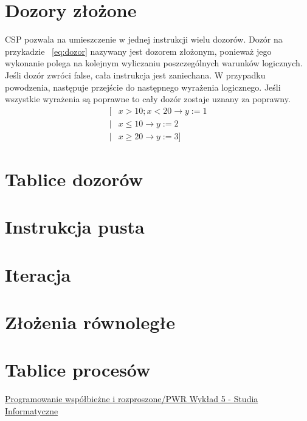 \documentclass[a4paper]{report}
\begin{document}
  \section{Dozory złożone}
  CSP pozwala na umieszczenie w jednej instrukcji wielu dozorów.
  Dozór na przykadzie ~\ref{eq:dozor} nazywany jest dozorem złożonym, ponieważ jego wykonanie polega na kolejnym wyliczaniu poszczególnych warunków logicznych.
  Jeśli dozór zwróci false, cała instrukcja jest zaniechana.
  W przypadku powodzenia, następuje przejście do następnego wyrażenia logicznego.
  Jeśli wszystkie wyrażenia są poprawne to cały dozór zostaje uznany za poprawny.
  \begin{equation}
    \label{eq:dozor}
    \begin{split}
      \lbrack & x > 10; x < 20 \rightarrow y := 1\\
      | & x \leq 10 \rightarrow y := 2\\
      | & x \geq 20 \rightarrow y := 3 \rbrack
    \end{split}
  \end{equation}

  \section{Tablice dozorów}

  \section{Instrukcja pusta}

  \section{Iteracja}

  \section{Złożenia równoległe}

  \section{Tablice procesów}

  \begin{thebibliography}{9}
     \href{http://wazniak.mimuw.edu.pl/index.php?title=Programowanie\_wsp\%C3\%B3\%C5\%82bie\%C5\%BCne\_i\_rozproszone/PWR\_Wyk\%C5\%82ad\_5}{Programowanie współbieżne i rozproszone/PWR Wykład 5 - Studia Informatyczne}
  \end{thebibliography}
\end{document}
